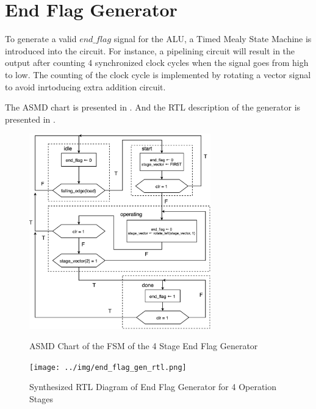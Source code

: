 \section{End Flag Generator}

To generate a valid \(end\_flag\) signal for the ALU, a Timed Mealy State Machine is introduced into the circuit.
For instance, a pipelining circuit will result in the output after counting 4 synchronized clock cycles
when the  signal goes from high to low. The counting of the clock cycle is implemented by rotating a
vector signal to avoid inrtoducing extra addition circuit.

The ASMD chart is presented in .
And the RTL description of the generator is presented in .

\begin{figure}[!ht]
	\centering
	\caption{ASMD Chart of the FSM of the 4 Stage End Flag Generator}
	\includegraphics[width=0.7\textwidth]{../img/asmd.png}
	\label{fig:asmd}
\end{figure}

\begin{figure}[!ht]
	\centering
	\caption{Synthesized RTL Diagram of End Flag Generator for 4 Operation Stages}
	\texttt{[image: ../img/end\_flag\_gen\_rtl.png]}
	\label{fig:end_flag_gen_rtl}
\end{figure}
